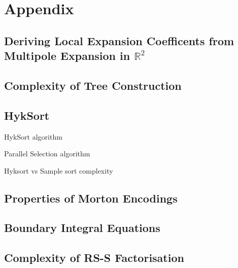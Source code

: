 \chapter{Appendix}

\section{Deriving Local Expansion Coefficents from Multipole Expansion in $\mathbb{R}^2$}\label{app:a_1_fmm_algorithm}

\section{Complexity of Tree Construction}\label{app:a_2_complexity_tree_construction}


\section{HykSort}\label{app:a_3:hyksort}

HykSort algorithm

Parallel Selection algorithm


Hyksort vs Sample sort complexity

\section{Properties of Morton Encodings}\label{app:a_4:morton}

\section{Boundary Integral Equations}\label{app:a_5:bie}

\section{Complexity of RS-S Factorisation}\label{app:a_6:rss_complexity}